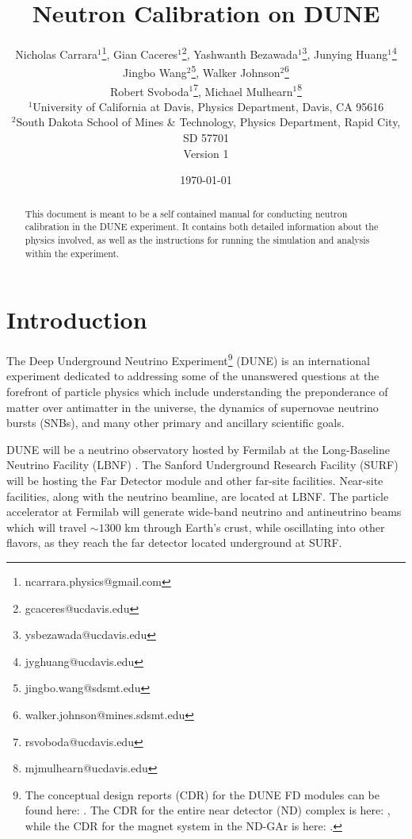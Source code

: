 \documentclass[8pt]{refart}
\title{Neutron Calibration on DUNE}
\author{Nicholas Carrara$^1$\thanks{ncarrara.physics@gmail.com}, Gian Caceres$^1$\thanks{gcaceres@ucdavis.edu}, Yashwanth Bezawada$^1$\thanks{ysbezawada@ucdavis.edu}, Junying Huang$^1$\thanks{jyghuang@ucdavis.edu}\\Jingbo Wang$^2$\thanks{jingbo.wang@sdsmt.edu}, Walker Johnson$^2$\thanks{walker.johnson@mines.sdsmt.edu}\\
Robert Svoboda$^1$\thanks{rsvoboda@ucdavis.edu}, Michael Mulhearn$^1$\thanks{mjmulhearn@ucdavis.edu}\\
${}^1$University of California at Davis, Physics Department, Davis, CA 95616\\
${}^2$South Dakota School of Mines \& Technology, Physics Department, Rapid City, SD 57701\\
Version 1}
\date{\today}
\begin{document}
\maketitle

\begin{abstract}
        This document is meant to be a self contained manual for conducting neutron calibration in the DUNE experiment.  It contains both detailed information about the physics involved, as well as the instructions for running the simulation and analysis within the experiment.
\end{abstract}


\tableofcontents
 
\newpage



\section{Introduction}

The Deep Underground Neutrino Experiment\footnote{The conceptual design reports (CDR) for the DUNE FD modules can be found here: \cite{DUNEFDCDR1,DUNEFDCDR2,DUNEFDCDR3,DUNEFDCDR4} .  The CDR for the entire near detector (ND) complex is here: \cite{DUNENDCDR}, while the CDR for the magnet system in the ND-GAr is here: \cite{DUNECDRMagnet}.} (DUNE) \cite{DUNETDR1,DUNETDR2,DUNETDR3,DUNETDR4} is an international experiment dedicated to addressing some of the unanswered questions at the forefront of particle physics which include understanding the preponderance of matter over antimatter in the universe, the dynamics of supernovae neutrino bursts (SNBs), and many other primary and ancillary scientific goals.

DUNE will be a neutrino observatory hosted by Fermilab \cite{Fermilab} at the Long-Baseline Neutrino Facility (LBNF) \cite{LBNF}. The Sanford Underground Research Facility (SURF) \cite{SURF} will be hosting the Far Detector module and other far-site facilities. Near-site facilities, along with the neutrino beamline, are located at LBNF. The particle accelerator at Fermilab will generate wide-band neutrino and antineutrino beams which will travel $\sim 1300$ km through Earth's crust, while oscillating into other flavors, as they reach the far detector located underground at SURF.

\end{document}
